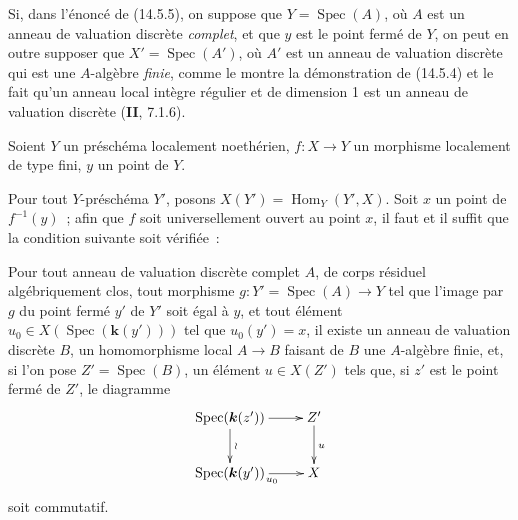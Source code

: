 \begin{remark}[14.5.7]
Si, dans l'énoncé de (14.5.5), on suppose que $Y=\operatorname{Spec}(A)$, où $A$ est un anneau
de valuation discrète \emph{complet}, et que $y$ est le point fermé de $Y$, on peut en
outre supposer que $X'=\operatorname{Spec}(A')$, où $A'$ est un anneau de valuation discrète qui
est une $A$-algèbre \emph{finie}, comme le montre la démonstration de (14.5.4) et le fait
qu'un anneau local intègre régulier et de dimension 1 est un anneau de valuation
discrète (\textbf{II}, 7.1.6).
\end{remark}

\begin{proposition}[14.5.8]
\label{IV.14.5.8-fr}
Soient $Y$ un préschéma localement noethérien, $f:X\to Y$ un morphisme localement
de type fini, $y$ un point de $Y$.

Pour tout $Y$-préschéma $Y'$, posons $X(Y')=\operatorname{Hom}_Y(Y',X)$. Soit $x$ un point de
$f^{-1}(y)$~; afin que $f$ soit universellement ouvert au point $x$, il faut et il
suffit que la condition suivante soit vérifiée~:

Pour tout anneau de valuation discrète complet $A$, de corps résiduel
algébriquement clos, tout morphisme $g:Y'=\operatorname{Spec}(A)\to Y$ tel que l'image par $g$ du
point fermé $y'$ de $Y'$ soit égal à $y$, et tout élément
$u_0\in X(\operatorname{Spec}(\boldsymbol{k}(y')))$ tel que $u_0(y')=x$, il existe un anneau de valuation
discrète $B$, un homomorphisme local $A\to B$ faisant de $B$ une $A$-algèbre finie,
et, si l'on pose $Z'=\operatorname{Spec}(B)$, un élément $u\in X(Z')$ tels que, si $z'$ est le
point fermé de $Z'$, le diagramme
\[
  \xymatrix{
    \operatorname{Spec}(\boldsymbol{k}(z')) \ar[r] \ar[d]^{\wr} & Z' \ar[d]^{u} \\
    \operatorname{Spec}(\boldsymbol{k}(y')) \ar[r]_{u_0} & X
  }
\]
soit commutatif.
\end{proposition}

